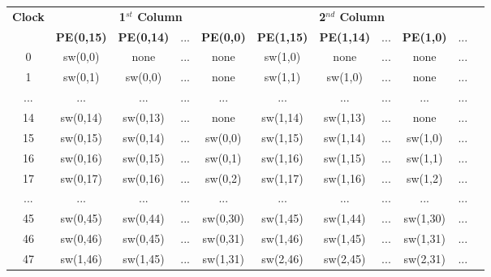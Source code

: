 \begin{table}[H]
	\centering
	\begin{tabular}{|c|c|c|c|c|c|c|c|c|c|c|}
		\hline
		
		\textbf{Clock} &  \multicolumn{4}{c|}{\textbf{1$^{st}$ Column}} &  \multicolumn{4}{c|}{\textbf{2$^{nd}$ Column}} & \\
		
		\cline{2-9}
		
		& \textbf{PE(0,15)} & \textbf{PE(0,14)} & ... & \textbf{PE(0,0)} & \textbf{PE(1,15)} & \textbf{PE(1,14)} & ... & \textbf{PE(1,0)} & ... \\
		
		\hline
		0 & sw(0,0) & none & ... & none & sw(1,0) & none & ... & none & ... \\
		
		1 & sw(0,1) & sw(0,0) & ... & none & sw(1,1) & sw(1,0) & ... & none & ... \\
		
		... & ... & ... & ... & ... & ... & ... & ... & ... & ... \\
		
		14 & sw(0,14) & sw(0,13) & ... & none & sw(1,14) & sw(1,13) & ... & none & ... \\
		
		15 & sw(0,15) & sw(0,14) & ... & sw(0,0) & sw(1,15) & sw(1,14) & ... & sw(1,0) & ... \\
		
		\hline
		
		16 & sw(0,16) & sw(0,15) & ... & sw(0,1) & sw(1,16) & sw(1,15) & ... & sw(1,1) & ... \\
		
		17 & sw(0,17) & sw(0,16) & ... & sw(0,2) & sw(1,17) & sw(1,16) & ... & sw(1,2) & ... \\
		
		... & ... & ... & ... & ... & ... & ... & ... & ... & ... \\
		
		45 & sw(0,45) & sw(0,44) & ... & sw(0,30) & sw(1,45) & sw(1,44) & ... & sw(1,30) & ... \\
		
		46 & sw(0,46) & sw(0,45) & ... & sw(0,31) & sw(1,46) & sw(1,45) & ... & sw(1,31) & ... \\
		
		\hline
		
		47 & sw(1,46) & sw(1,45) & ... & sw(1,31) & sw(2,46) & sw(2,45) & ... & sw(2,31) & ... \\
		

\end{tabular}
\end{table}
